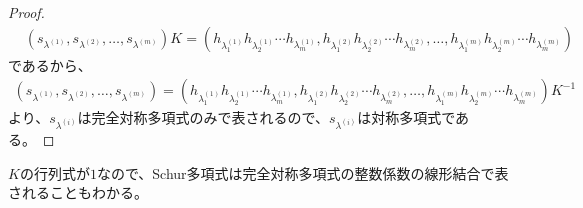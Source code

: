 \documentclass[a4paper,11pt]{jsarticle}
\theoremstyle{plain}
\theoremstyle{definition}
\renewcommand{\(}{\left(}
\renewcommand{\)}{\right)}
\renewcommand{\[}{\left[}
\renewcommand{\]}{\right]}
\renewcommand{\{}{\left\lbrace}
\renewcommand{\}}{\right\rbrace}
\newcommand{\pmat}[1]{\begin{pmatrix} #1 \end{pmatrix}}
\begin{document}
\begin{proof}
    \begin{align*}
        &(s_{\lambda^{(1)}}, s_{\lambda^{(2)}}, \ldots, s_{\lambda^{(m)}}) 
        K
        = (h_{\lambda^{(1)}_1} h_{\lambda^{(1)}_2} \cdots h_{\lambda^{(1)}_m}, h_{\lambda^{(2)}_1} h_{\lambda^{(2)}_2} \cdots h_{\lambda^{(2)}_m}, \ldots, h_{\lambda^{(m)}_1} h_{\lambda^{(m)}_2} \cdots h_{\lambda^{(m)}_m})
    \end{align*}
    であるから、
    \begin{align*}
        (s_{\lambda^{(1)}}, s_{\lambda^{(2)}}, \ldots, s_{\lambda^{(m)}}) = (h_{\lambda^{(1)}_1} h_{\lambda^{(1)}_2} \cdots h_{\lambda^{(1)}_m}, h_{\lambda^{(2)}_1} h_{\lambda^{(2)}_2} \cdots h_{\lambda^{(2)}_m}, \ldots, h_{\lambda^{(m)}_1} h_{\lambda^{(m)}_2} \cdots h_{\lambda^{(m)}_m})K^{-1}
    \end{align*}
    より、$s_{\lambda^{(i)}}$は完全対称多項式のみで表されるので、$s_{\lambda^{(i)}}$は対称多項式である。
\end{proof}

$K$の行列式が$1$なので、Schur多項式は完全対称多項式の整数係数の線形結合で表されることもわかる。


\end{document}
